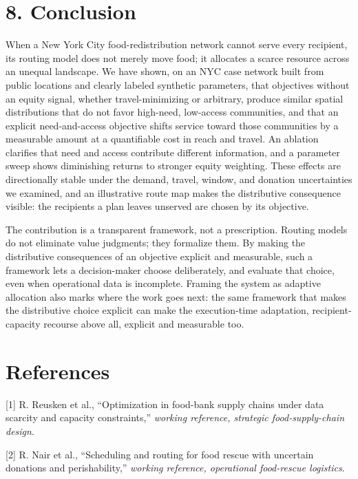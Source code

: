 \documentclass[
  11pt,
]{article}
\begin{document}
\section{8. Conclusion}\label{conclusion}

When a New York City food-redistribution network cannot serve every
recipient, its routing model does not merely move food; it allocates a
scarce resource across an unequal landscape. We have shown, on an NYC
case network built from public locations and clearly labeled synthetic
parameters, that objectives without an equity signal, whether
travel-minimizing or arbitrary, produce similar spatial distributions
that do not favor high-need, low-access communities, and that an
explicit need-and-access objective shifts service toward those
communities by a measurable amount at a quantifiable cost in reach and
travel. An ablation clarifies that need and access contribute different
information, and a parameter sweep shows diminishing returns to stronger
equity weighting. These effects are directionally stable under the
demand, travel, window, and donation uncertainties we examined, and an
illustrative route map makes the distributive consequence visible: the
recipients a plan leaves unserved are chosen by its objective.

The contribution is a transparent framework, not a prescription. Routing
models do not eliminate value judgments; they formalize them. By making
the distributive consequences of an objective explicit and measurable,
such a framework lets a decision-maker choose deliberately, and evaluate
that choice, even when operational data is incomplete. Framing the
system as adaptive allocation also marks where the work goes next: the
same framework that makes the distributive choice explicit can make the
execution-time adaptation, recipient-capacity recourse above all,
explicit and measurable too.

\section{References}\label{references}

{[}1{]} R. Reusken et al., ``Optimization in food-bank supply chains
under data scarcity and capacity constraints,'' \emph{working reference,
strategic food-supply-chain design}.

{[}2{]} R. Nair et al., ``Scheduling and routing for food rescue with
uncertain donations and perishability,'' \emph{working reference,
operational food-rescue logistics}.
\end{document}
